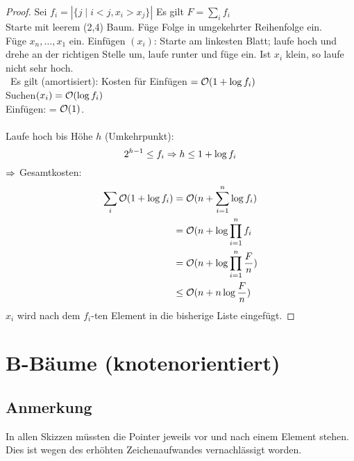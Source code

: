             \begin{proof}
                Sei $f_i = |\{ j \mid i < j , x_i > x_j \}|$ Es gilt $F= \sum \limits_{i} f_i$ \\
                Starte mit leerem (2,4) Baum. Füge Folge in umgekehrter Reihenfolge ein. \\
                
                Füge $x_n, \ldots, x_1$ ein. Einfügen $(x_i)$: Starte am linkesten Blatt; laufe hoch und drehe an der richtigen Stelle um,
                laufe runter und füge ein. Ist $x_i$ klein, so laufe nicht sehr hoch. \\\
                Es gilt (amortisiert): Kosten für Einfügen $= \mathcal{O}(1 + \log f_i)$ \\
                Suchen$(x_i) = \mathcal{O}(\log f_i)$ \\
                Einfügen: = $\mathcal{O}(1)$. \\\\
                Laufe hoch bis Höhe $h$ (Umkehrpunkt): \\
                $$2^{h-1} \leq f_i \Ra h \leq 1 + \log f_i$$
                $\Ra$ Gesamtkosten: 
                \begin{align*}
                		\sum \limits_{i} \mathcal{O}(1+ \log f_i) 	&= \mathcal{O}(n + \sum \limits_{i=1}^n \log f_i) \\
                									&= \mathcal{O}(n+\log \prod \limits_{i=1}^n f_i\\
                									&= \mathcal{O}(n+\log \prod \limits_{i=1}^n \frac{F}{n})	\\
                									&\leq \mathcal{O}(n + n \log \frac{F}{n})
                \end{align*}
                $x_i$ wird nach dem $f_i$-ten Element in die bisherige Liste eingefügt.
            \end{proof}
        
        
        
    \section{B-Bäume (knotenorientiert)}
        \subsection*{Anmerkung}
            In allen Skizzen müssten die Pointer jeweils vor und nach einem Element stehen. Dies ist wegen des erhöhten Zeichenaufwandes vernachlässigt worden.
            
